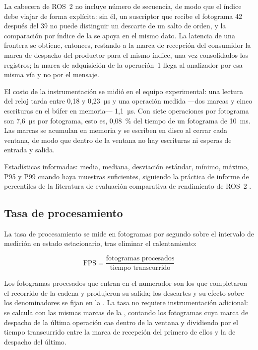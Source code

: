 La cabecera de ROS~2 no incluye número de secuencia, de modo que el índice debe
viajar de forma explícita: sin él, un suscriptor que recibe el fotograma 42
después del 39 no puede distinguir un descarte de un salto de orden, y la
comparación por índice de la  se apoya en el mismo dato.
La latencia de una frontera se obtiene, entonces, restando a la marca de
recepción del consumidor la marca de despacho del productor para el mismo
índice, una vez consolidados los registros; la marca de adquisición de la
operación~1 llega al analizador por esa misma vía y no por el mensaje.

El costo de la instrumentación se midió en el equipo experimental: una
lectura del reloj tarda entre 0,18 y 0,23~µs y una operación medida ---dos
marcas y cinco escrituras en el búfer en memoria--- 1,1~µs. Con siete
operaciones por fotograma son 7,6~µs por fotograma, esto es, 0,08~\% del
tiempo de un fotograma de 10~ms. Las marcas se acumulan en memoria y se
escriben en disco al cerrar cada ventana, de modo que dentro de la ventana no
hay escrituras ni esperas de entrada y salida.

Estadísticas informadas: media, mediana,
desviación estándar, mínimo, máximo, P95 y P99 cuando haya muestras
suficientes, siguiendo la práctica de informe de percentiles de la literatura
de evaluación comparativa de rendimiento de ROS~2 \cite{kronauer2021,
macenski2022}.

\subsection{Tasa de procesamiento}

La tasa de procesamiento se mide en fotogramas por segundo sobre el
intervalo de medición en estado estacionario, tras eliminar el calentamiento:

\begin{equation}
  \mathrm{FPS} = \frac{\text{fotogramas procesados}}{\text{tiempo
  transcurrido}}
  \label{eq:fps}
\end{equation}

Los fotogramas procesados que entran en el numerador son los que completaron
el recorrido de la cadena y produjeron su salida; los descartes y su efecto
sobre los denominadores se fijan en la . La tasa no
requiere instrumentación adicional: se calcula con las mismas marcas de la
, contando los fotogramas cuya marca de despacho
de la última operación cae dentro de la ventana y dividiendo por el tiempo
transcurrido entre la marca de recepción del primero de ellos y la de
despacho del último.

